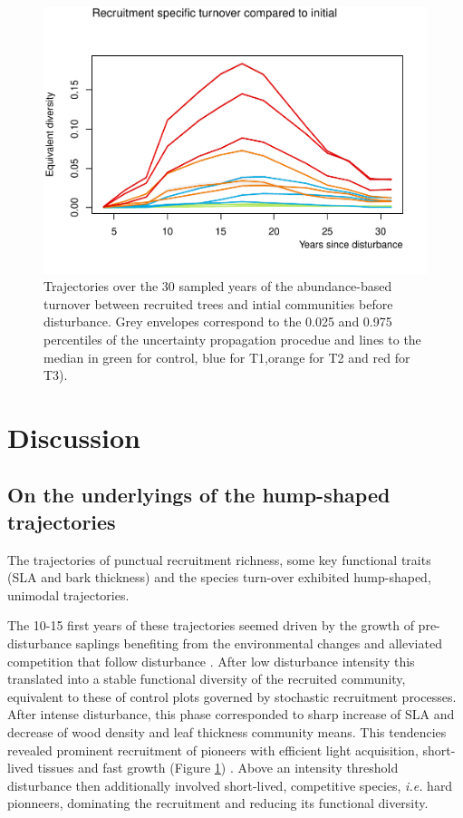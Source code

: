 \documentclass[fleqn,10pt]{ArtEcoFoG} %
\begin{document}
\begin{figure}

{\centering \includegraphics{RecruitmentTrajectories_files/figure-latex/Fig4-1} 

}

\caption{Trajectories over the 30 sampled years of the abundance-based turnover between recruited trees and intial communities before disturbance. Grey envelopes correspond to the 0.025 and 0.975 percentiles of the uncertainty propagation procedue and lines to the median in green for control, blue for T1,orange for T2 and red for T3).}\label{fig:Fig4}
\end{figure}

\section{Discussion}\label{discussion}

\subsection{On the underlyings of the hump-shaped
trajectories}\label{on-the-underlyings-of-the-hump-shaped-trajectories}

The trajectories of punctual recruitment richness, some key functional
traits (SLA and bark thickness) and the species turn-over exhibited
hump-shaped, unimodal trajectories.

The 10-15 first years of these trajectories seemed driven by the growth
of pre-disturbance saplings benefiting from the environmental changes
and alleviated competition that follow disturbance \citep{Herault2010}.
After low disturbance intensity this translated into a stable functional
diversity of the recruited community, equivalent to these of control
plots governed by stochastic recruitment processes. After intense
disturbance, this phase corresponded to sharp increase of SLA and
decrease of wood density and leaf thickness community means. This
tendencies revealed prominent recruitment of pioneers with efficient
light acquisition, short-lived tissues and fast growth (Figure
\ref{fig:Fig4}) \citep{Wright2004, Chave2009b, Herault2011, Reich2014}.
Above an intensity threshold disturbance then additionally involved
short-lived, competitive species, \emph{i.e.} hard pionneers, dominating
the recruitment and reducing its functional diversity.
\end{document}

